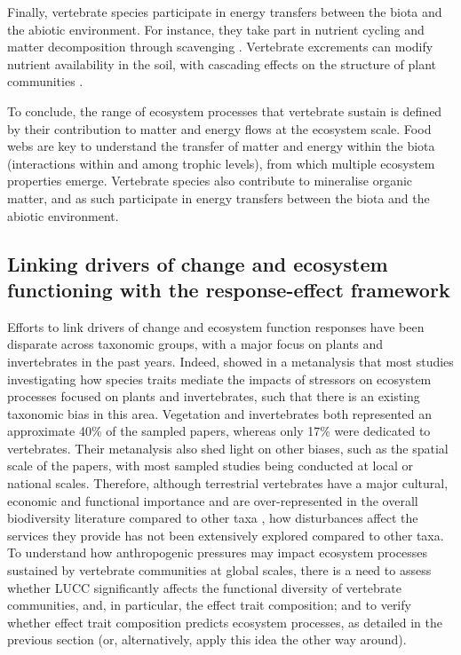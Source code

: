 Finally, vertebrate species participate in energy transfers between the biota and the abiotic environment. For instance, they take part in nutrient cycling and matter decomposition through scavenging \citep{Cunningham2018, Inger2016,Wilson2011}. Vertebrate excrements can modify nutrient availability in the soil, with cascading effects on the structure of plant communities \citep{Severtsov2013}.
  
To conclude, the range of ecosystem processes that vertebrate sustain is defined by their contribution to matter and energy flows at the ecosystem scale. Food webs are key to understand the transfer of matter and energy within the biota (interactions within and among trophic levels), from which multiple ecosystem properties emerge. Vertebrate species also contribute to mineralise organic matter, and as such participate in energy transfers between the biota and the abiotic environment. 


\subsection{Linking drivers of change and ecosystem functioning with the response-effect framework}
Efforts to link drivers of change and ecosystem function responses have been disparate across taxonomic groups, with a major focus on plants and invertebrates in the past years. Indeed, \citet{Hevia2017} showed in a metanalysis that most studies investigating how species traits mediate the impacts of stressors on ecosystem processes focused on plants and invertebrates, such that there is an existing taxonomic bias in this area. Vegetation and invertebrates both represented an approximate 40\% of the sampled papers, whereas only 17\% were dedicated to vertebrates. Their metanalysis also shed light on other biases, such as the spatial scale of the papers, with most sampled studies being conducted at local or national scales. Therefore, although terrestrial vertebrates have a major cultural, economic and functional importance and are over-represented in the overall biodiversity literature compared to other taxa \citep{Titley2017}, how disturbances affect the services they provide has not been extensively explored compared to other taxa. To understand how anthropogenic pressures may impact ecosystem processes sustained by vertebrate communities  at global scales, there is a need to assess whether LUCC significantly affects the functional diversity of vertebrate communities, and, in particular, the effect trait composition; and to verify whether effect trait composition predicts ecosystem processes, as detailed in the previous section (or, alternatively, apply this idea the other way around). 

